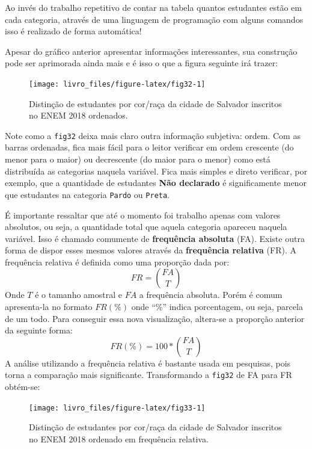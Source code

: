 \documentclass[
]{book}
\begin{document}
Ao invés do trabalho repetitivo de contar na tabela quantos estudantes estão em cada categoria, através de uma linguagem de programação com alguns comandos isso é realizado de forma automática!

Apesar do gráfico anterior apresentar informações interessantes, sua construção pode ser aprimorada ainda mais e é isso o que a figura seguinte irá trazer:

\begin{figure}

{\centering \texttt{[image: livro\_files/figure-latex/fig32-1]} 

}

\caption{Distinção de estudantes por cor/raça da cidade de Salvador inscritos no ENEM 2018 ordenados.}\label{fig:fig32}
\end{figure}

Note como a \texttt{fig32} deixa mais claro outra informação subjetiva: ordem. Com as barras ordenadas, fica mais fácil para o leitor verificar em ordem crescente (do menor para o maior) ou decrescente (do maior para o menor) como está distribuída as categorias naquela variável. Fica mais simples e direto verificar, por exemplo, que a quantidade de estudantes \textbf{Não declarado} é significamente menor que estudantes na categoria \texttt{Pardo} ou \texttt{Preta}.

É importante ressaltar que até o momento foi trabalho apenas com valores absolutos, ou seja, a quantidade total que aquela categoria apareceu naquela variável. Isso é chamado comumente de \textbf{frequência absoluta} (FA). Existe outra forma de dispor esses mesmos valores através da \textbf{frequência relativa} (FR). A frequência relativa é definida como uma proporção dada por:
\[FR = {FA \choose T}\]
Onde \(T\) é o tamanho amostral e \(FA\) a frequência absoluta. Porém é comum apresenta-la no formato \(FR (\%)\) onde ``\%'' indica porcentagem, ou seja, parcela de um todo. Para conseguir essa nova visualização, altera-se a proporção anterior da seguinte forma:
\[FR (\%) = 100*{FA \choose T}\]
A análise utilizando a frequência relativa é bastante usada em pesquisas, pois torna a comparação mais significante. Transformando a \texttt{fig32} de FA para FR obtém-se:

\begin{figure}

{\centering \texttt{[image: livro\_files/figure-latex/fig33-1]} 

}

\caption{Distinção de estudantes por cor/raça da cidade de Salvador inscritos no ENEM 2018 ordenado em frequência relativa.}\label{fig:fig33}
\end{figure}
\end{document}

